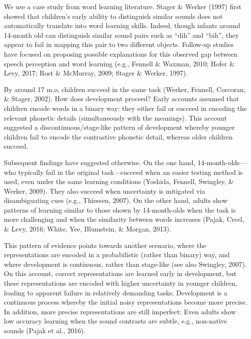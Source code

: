 \documentclass[10pt, letterpaper]{article}
\begin{document}
We use a case study from word learning literature. Stager \& Werker
(1997) first showed that children's early ability to distinguish similar
sounds does not automatically translate into word learning skills.
Indeed, though infants around 14-month old can distinguish similar sound
pairs such as ``dih'' and ``bih'', they appear to fail in mapping this
pair to two different objects. Follow-up studies have focused on
proposing possible explanations for this observed gap between speech
perception and word learning (e.g., Fennell \& Waxman, 2010; Hofer \&
Levy, 2017; Rost \& McMurray, 2009; Stager \& Werker, 1997).

By around 17 m.o, children succeed in the same task (Werker, Fennell,
Corcoran, \& Stager, 2002). How does development proceed? Early accounts
assumed that children encode words in a binary way: they either fail or
succeed in encoding the relevant phonetic details (simultaneously with
the meanings). This account suggested a discontinuous/stage-like pattern
of development whereby younger children fail to encode the contrastive
phonetic detail, whereas older children succeed.

Subsequent findings have suggested otherwise. On the one hand,
14-month-olds---who typically fail in the original task---succeed when
an easier testing method is used, even under the same learning
conditions (Yoshida, Fennell, Swingley, \& Werker, 2009). They also
succeed when uncertainty is mitigated via disambiguating cues (e.g.,
Thiessen, 2007). On the other hand, adults show patterns of learning
similar to those shown by 14-month-olds when the task is more
challenging and when the similarity between words increases (Pajak,
Creel, \& Levy, 2016; White, Yee, Blumstein, \& Morgan, 2013).

This pattern of evidence points towards another scenario, where the
representations are encoded in a probabilistic (rather than binary) way,
and where development is continuous, rather than stage-like (see also
Swingley, 2007). On this account, correct representations are learned
early in development, but these representations are encoded with higher
uncertainty in younger children, leading to apparent failure in
relatively demanding tasks. Development is a continuous process whereby
the initial noisy representations become more precise. In addition, more
precise representations are still imperfect: Even adults show low
accuracy learning when the sound contrasts are subtle, e.g., non-native
sounds (Pajak et al., 2016).
\end{document}
